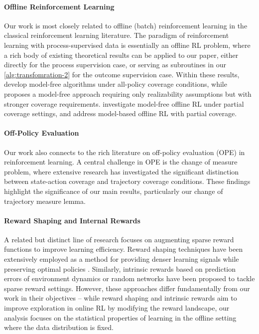 \paragraph{Offline Reinforcement Learning}
Our work is most closely related to offline (batch) reinforcement learning in the classical reinforcement learning literature.
The paradigm of reinforcement learning with process-supervised data is essentially an offline RL problem, where a rich body of existing theoretical results \citep[e.g.,][]{munos2003error,antos2008learning,farahmand2010error,chen2019information,xie2020q,jin2021pessimism,xie2021batch,xie2021bellman,uehara2021pessimistic,cheng2022adversarially,xie2022armor,bhardwaj2023adversarial} can be applied to our paper, either directly for the process supervision case, or serving as subroutines in our \cref{alg:transfomration-2} for the outcome supervision case.
Within these results, \citet{chen2019information,xie2020q} develop model-free algorithms under all-policy coverage conditions, while \citet{xie2021batch} proposes a model-free approach requiring only realizability assumptions but with stronger coverage requirements. \citet{xie2021bellman,cheng2022adversarially} investigate model-free offline RL under partial coverage settings, and \citet{uehara2021pessimistic,xie2022armor,bhardwaj2023adversarial} address model-based offline RL with partial coverage.

\paragraph{Off-Policy Evaluation}
Our work also connects to the rich literature on off-policy evaluation (OPE) in reinforcement learning. A central challenge in OPE is the change of measure problem, where extensive research \citep{liu2018breaking,xie2019towards,nachum2019dualdice,uehara2020minimax} has investigated the significant distinction between state-action coverage and trajectory coverage conditions. These findings highlight the significance of our main results, particularly our change of trajectory measure lemma.


\paragraph{Reward Shaping and Internal Rewards}
A related but distinct line of research focuses on augmenting sparse reward functions to improve learning efficiency. Reward shaping techniques have been extensively employed as a method for providing denser learning signals while preserving optimal policies \citep[e.g.,][]{ng1999policy,trott2019keeping,gupta2022unpacking}. Similarly, intrinsic rewards based on prediction errors of environment dynamics \citep{pathak2017curiosity} or random networks \citep{burda2018exploration} have been proposed to tackle sparse reward settings. However, these approaches differ fundamentally from our work in their objectives -- while reward shaping and intrinsic rewards aim to improve exploration in online RL by modifying the reward landscape, our analysis focuses on the statistical properties of learning in the offline setting where the data distribution is fixed.

